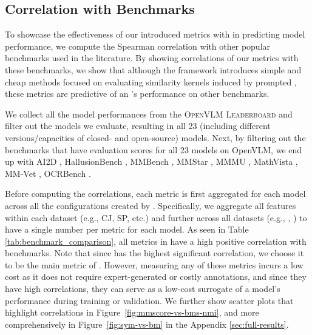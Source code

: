 \vspace{-2mm}
\subsection{Correlation with Benchmarks}

To showcase the effectiveness of our introduced metrics with \mmscore{} in predicting model performance, we compute the Spearman correlation with other popular benchmarks used in the literature. By showing correlations of our metrics with these benchmarks, we show that although the \mmscore{} framework introduces simple and cheap methods focused on evaluating similarity kernels induced by prompted \modelss{}, these metrics are predictive of an \model{}'s performance on other benchmarks.

We collect all the model performances from the \textsc{OpenVLM Leaderboard}\cite{duan2024vlmevalkit} and filter out the models we evaluate, resulting in all 23  (including different versions/capacities of closed- and open-source) models. Next, by filtering out the benchmarks that have evaluation scores for all 23 models on OpenVLM, we end up with AI2D \cite{kembhavi2016diagram}, HallusionBench \cite{guan2024hallusionbench}, MMBench \cite{liu2025mmbench}, MMStar \cite{chen2024we}, MMMU \cite{yue2024mmmu}, MathVista \cite{lu2023mathvista}, MM-Vet \cite{yu2023mm}, OCRBench \cite{liu2024ocrbench}.


Before computing the correlations, each metric is first aggregated for each model across all the configurations created by \mmscore. Specifically, we aggregate all features within each dataset (e.g., CJ, SP, etc.) and further across all datasets (e.g., \coco, \wu) to have a single number per metric for each model. As seen in Table \ref{tab:benchmark_comparison}, all metrics in \mmscore{} have a high positive correlation with benchmarks. Note that since \nmi{} has the highest significant correlation, we choose it to be the main metric of \mmscore. However, measuring any of these metrics incurs a low cost as it does not require expert-generated or costly annotations, and since they have high correlations, they can serve as a low-cost surrogate of a model's performance during training or validation. We further show scatter plots that highlight correlations in Figure~\ref{fig:mmscore-vs-bms-nmi}, and more comprehensively in Figure~\ref{fig:sym-vs-bm} in the Appendix \ref{sec:full-results}.




